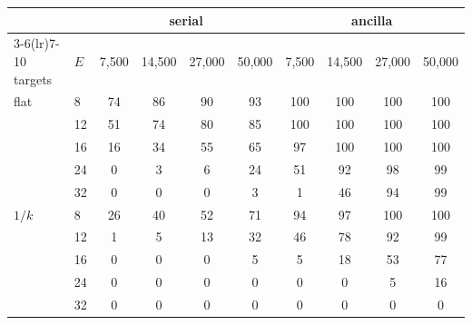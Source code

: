 \begin{tabular}{llcccccccc}\toprule
 & & \multicolumn{4}{c}{serial} & \multicolumn{4}{c}{ancilla} \\\cmidrule(lr){3-6}\cmidrule(lr){7-10}
targets & $E$ & 7{,}500 & 14{,}500 & 27{,}000 & 50{,}000 & 7{,}500 & 14{,}500 & 27{,}000 & 50{,}000 \\\midrule
flat & 8 & 74 & 86 & 90 & 93 & 100 & 100 & 100 & 100 \\
 & 12 & 51 & 74 & 80 & 85 & 100 & 100 & 100 & 100 \\
 & 16 & 16 & 34 & 55 & 65 & 97 & 100 & 100 & 100 \\
 & 24 & 0 & 3 & 6 & 24 & 51 & 92 & 98 & 99 \\
 & 32 & 0 & 0 & 0 & 3 & 1 & 46 & 94 & 99 \\
\midrule
$1/k$ & 8 & 26 & 40 & 52 & 71 & 94 & 97 & 100 & 100 \\
 & 12 & 1 & 5 & 13 & 32 & 46 & 78 & 92 & 99 \\
 & 16 & 0 & 0 & 0 & 5 & 5 & 18 & 53 & 77 \\
 & 24 & 0 & 0 & 0 & 0 & 0 & 0 & 5 & 16 \\
 & 32 & 0 & 0 & 0 & 0 & 0 & 0 & 0 & 0 \\
\bottomrule
\end{tabular}
